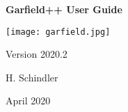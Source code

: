 \begin{titlepage}
  {
  \centering
  \sffamily
  \linespread{1.5}

  \vspace{3cm} 

  \huge{\textbf{Garfield++ User Guide}}

  \vspace{2cm}

  \texttt{[image: garfield.jpg]}

  \vspace{2cm}

  \large
  Version 2020.2 

  \vspace{2cm}
  \large
  H. Schindler

  \vfill

  April 2020

  }
\end{titlepage}
